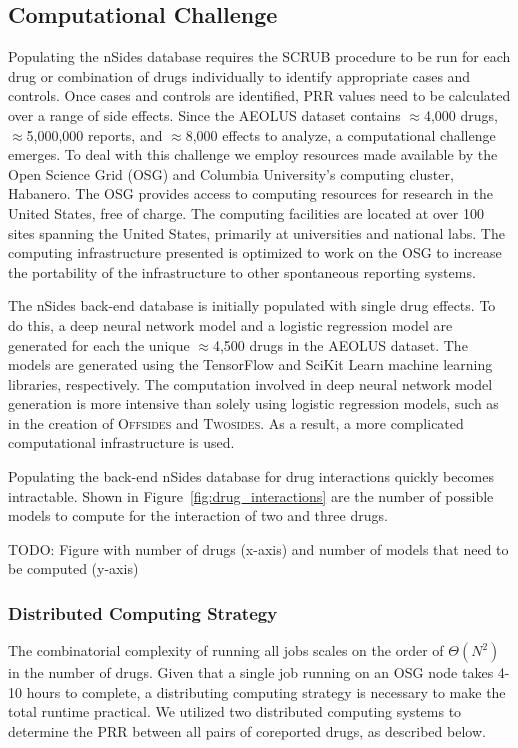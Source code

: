 \documentclass{ws-procs11x85}
\begin{document}
\subsection{Computational Challenge}

Populating the nSides database requires the SCRUB procedure to be run
for each drug or combination of drugs individually to identify
appropriate cases and controls. Once cases and controls are
identified, PRR values need to be calculated over a range of side
effects. Since the AEOLUS dataset contains $\approx$4,000 drugs,
$\approx$5,000,000 reports, and $\approx$8,000 effects to analyze, a
computational challenge emerges.  To deal with this challenge we
employ resources made available by the Open Science Grid (OSG) and
Columbia University's computing cluster, Habanero. The OSG provides
access to computing resources for research in the United States, free
of charge. The computing facilities are located at over 100 sites
spanning the United States, primarily at universities and national
labs.  The computing infrastructure presented is optimized to work on
the OSG to increase the portability of the infrastructure to other
spontaneous reporting systems.

The nSides back-end database is initially populated with single drug
effects. To do this, a deep neural network model and a logistic
regression model are generated for each the unique $\approx$4,500
drugs in the AEOLUS dataset. The models are generated using the
TensorFlow and SciKit Learn machine learning libraries,
respectively. The computation involved in deep neural network model
generation is more intensive than solely using logistic regression
models, such as in the creation of O\textsc{ffsides} and
T\textsc{wosides}. As a result, a more complicated computational
infrastructure is used.

Populating the back-end nSides database for drug interactions quickly
becomes intractable.  Shown in Figure~\ref{fig:drug_interactions} are
the number of possible models to compute for the interaction of two
and three drugs.

TODO: Figure with number of drugs (x-axis) and number of models that need to be computed (y-axis)

\subsubsection{Distributed Computing Strategy}
The combinatorial complexity of running all jobs scales on the order
of $\Theta(N^2)$ in the number of drugs. Given that a single job
running on an OSG node takes 4-10 hours to complete, a distributing
computing strategy is necessary to make the total runtime
practical. We utilized two distributed computing systems to determine
the PRR between all pairs of coreported drugs, as described below.
\end{document}
